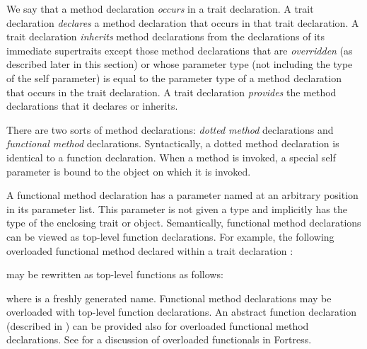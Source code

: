 We say that a method declaration \emph{occurs} in a trait declaration.
A trait declaration \emph{declares} a method declaration that occurs
in that trait declaration.
A trait declaration \emph{inherits} method declarations from the
declarations of its immediate supertraits
except those method declarations
that are \emph{overridden} (as described later in this section) or
whose parameter type (not including the type of the self parameter)
is equal to the parameter type of a method declaration
that occurs in the trait declaration.
A trait declaration \emph{provides} the method declarations that it
declares or inherits.




There are two sorts of method declarations:
\emph{dotted method} declarations and
\emph{functional method} declarations.
Syntactically, a dotted method declaration is identical to a function
declaration.
When a method is invoked, a special self parameter is bound to the
object on which it is invoked.



A functional method declaration has a parameter named  at an
arbitrary position in its parameter list.  This parameter is not given a type
and implicitly has the type of the enclosing trait or object.
Semantically, functional method declarations can be viewed as top-level
function declarations.  For example, the following overloaded functional method
 declared within a trait declaration :


may be rewritten as top-level functions as follows:


where  is a freshly generated name.
Functional method declarations may be overloaded with top-level function
declarations.
An abstract function declaration
(described in )
can be provided also for overloaded functional method declarations.
See  for a discussion of overloaded
functionals in Fortress.



